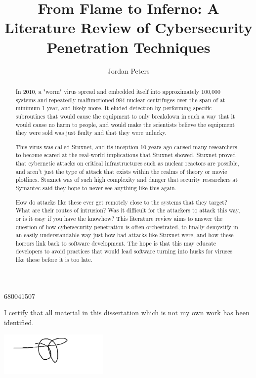 \documentclass[a4paper, 11pt]{article}
\title{From Flame to Inferno: A Literature Review of Cybersecurity Penetration Techniques}
\author{Jordan Peters}
\begin{document}
\begin{titlepage}
    \maketitle
    \begin{abstract}
        In 2010, a "worm" virus spread and embedded itself into approximately 100,000 systems and repeatedly malfunctioned 984 nuclear centrifuges over the span of at minimum 1 year, and likely more. It eluded detection by performing specific subroutines that would cause the equipment to only breakdown in such a way that it would cause no harm to people, and would make the scientists believe the equipment they were sold was just faulty and that they were unlucky.

        This virus was called Stuxnet, and its inception 10 years ago caused many researchers to become scared at the real-world implications that Stuxnet showed. Stuxnet proved that cybernetic attacks on critical infrastructures such as nuclear reactors are possible, and aren't just the type of attack that exists within the realms of theory or movie plotlines. Stuxnet was of such high complexity and danger that security researchers at Symantec said they hope to never see anything like this again.

        How do attacks like these ever get remotely close to the systems that they target? What are their routes of intrusion? Was it difficult for the attackers to attack this way, or is it easy if you have the knowhow? This literature review aims to answer the question of how cybersecurity penetration is often orchestrated, to finally demystify in an easily understandable way just how bad attacks like Stuxnet were, and how these horrors link back to software development. The hope is that this may educate developers to avoid practices that would lead software turning into husks for viruses like these before it is too late.
    \end{abstract}

    \begin{center}
    680041507

    I certify that all material in this dissertation which is not my own work has been identified.

    \includegraphics[width=200px]{figs/signature.png}

    \end{center}

\end{titlepage}
\end{document}
